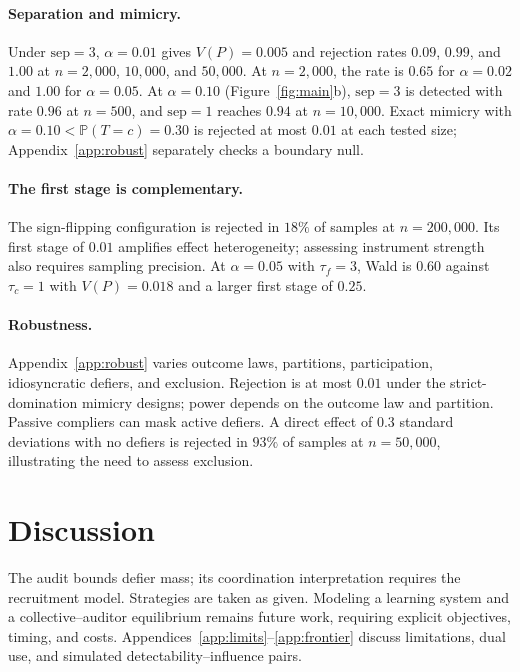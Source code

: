 \documentclass{article}
\theoremstyle{remark}
\newcommand{\Prob}{\mathbb{P}}
\begin{document}
\paragraph{Separation and mimicry.} Under $\mathrm{sep}=3$, $\alpha=0.01$ gives
$V(P)=0.005$ and rejection rates $0.09$, $0.99$, and $1.00$ at
$n=2{,}000$, $10{,}000$, and $50{,}000$. At $n=2{,}000$, the rate is $0.65$
for $\alpha=0.02$ and $1.00$ for $\alpha=0.05$. At $\alpha=0.10$
(Figure~\ref{fig:main}b), $\mathrm{sep}=3$ is detected with rate $0.96$ at
$n=500$, and $\mathrm{sep}=1$ reaches $0.94$ at $n=10{,}000$.
Exact mimicry with $\alpha=0.10<\Prob(T=c)=0.30$ is rejected at most $0.01$
at each tested size; Appendix~\ref{app:robust} separately checks a boundary null.

\paragraph{The first stage is complementary.} The sign-flipping configuration
is rejected in $18\%$ of samples at $n=200{,}000$. Its first stage of $0.01$
amplifies effect heterogeneity; assessing instrument strength also requires
sampling precision. At $\alpha=0.05$ with $\tau_f=3$, Wald is $0.60$ against
$\tau_c=1$ with $V(P)=0.018$ and a larger first stage of $0.25$.

\paragraph{Robustness.} Appendix~\ref{app:robust} varies outcome laws, partitions,
participation, idiosyncratic defiers, and exclusion. Rejection is at most
$0.01$ under the strict-domination mimicry designs; power depends on the outcome law and
partition. Passive compliers can mask active defiers. A direct effect of $0.3$
standard deviations with no defiers is rejected in $93\%$ of samples at
$n=50{,}000$, illustrating the need to assess exclusion.

\section{Discussion}\label{sec:disc}

The audit bounds defier mass; its coordination interpretation requires the
recruitment model. Strategies are taken as given. Modeling a learning system
and a collective--auditor equilibrium remains future work, requiring explicit
objectives, timing, and costs. Appendices~\ref{app:limits}--\ref{app:frontier}
discuss limitations, dual use, and simulated detectability--influence pairs.
\end{document}
